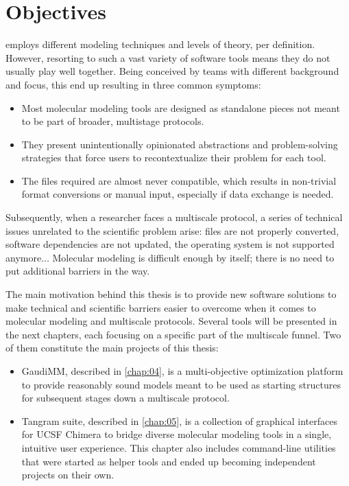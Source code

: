 \chapter{Objectives}
\label{chap:03}

 employs different modeling techniques and levels of theory, per definition. However, resorting to such a vast variety of software tools means they do not usually play well together. Being conceived by teams with different background and focus, this end up resulting in three common symptoms:

\begin{itemize}
	\item Most molecular modeling tools are designed as standalone pieces not meant to be part of broader, multistage protocols.

	\item They present unintentionally opinionated abstractions and problem-solving strategies that force users to recontextualize their problem for each tool.

	\item The files required are almost never compatible, which results in non-trivial format conversions or manual input, especially if data exchange is needed.
\end{itemize}

Subsequently, when a researcher faces a multiscale protocol, a series of technical issues unrelated to the scientific problem arise: files are not properly converted, software dependencies are not updated, the operating system is not supported anymore$ \ldots $  Molecular modeling is difficult enough by itself; there is no need to put additional barriers in the way.

The main motivation behind this thesis is to provide new software solutions to make technical and scientific barriers easier to overcome when it comes to molecular modeling and multiscale protocols. Several tools will be presented in the next chapters, each focusing on a specific part of the multiscale funnel. Two of them constitute the main projects of this thesis:

\begin{itemize}
	\item GaudiMM, described in \autoref{chap:04}, is a multi-objective optimization platform to provide reasonably sound models meant to be used as starting structures for subsequent stages down a multiscale protocol.

	\item Tangram suite, described in \autoref{chap:05}, is a collection of graphical interfaces for UCSF Chimera to bridge diverse molecular modeling tools in a single, intuitive user experience. This chapter also includes command-line utilities that were started as helper tools and ended up becoming independent projects on their own.
\end{itemize}


